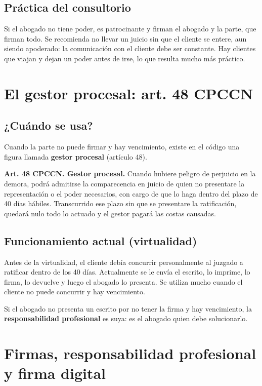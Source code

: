 \documentclass[12pt,oneside]{book}
\begin{document}
\subsection{Práctica del consultorio}

Si el abogado no tiene poder, es patrocinante y firman el abogado y la parte, que firman todo. Se recomienda no llevar un juicio sin que el cliente se entere, aun siendo apoderado: la comunicación con el cliente debe ser constante. Hay clientes que viajan y dejan un poder antes de irse, lo que resulta mucho más práctico.

\section{El gestor procesal: art. 48 CPCCN}

\subsection{¿Cuándo se usa?}

Cuando la parte no puede firmar y hay vencimiento, existe en el código una figura llamada \textbf{gestor procesal} (artículo 48).

\begin{important}
\textbf{Art. 48 CPCCN. Gestor procesal.} Cuando hubiere peligro de perjuicio en la demora, podrá admitirse la comparecencia en juicio de quien no presentare la representación o el poder necesarios, con cargo de que lo haga dentro del plazo de 40 días hábiles. Transcurrido ese plazo sin que se presentare la ratificación, quedará nulo todo lo actuado y el gestor pagará las costas causadas.
\end{important}

\subsection{Funcionamiento actual (virtualidad)}

Antes de la virtualidad, el cliente debía concurrir personalmente al juzgado a ratificar dentro de los 40 días. Actualmente se le envía el escrito, lo imprime, lo firma, lo devuelve y luego el abogado lo presenta. Se utiliza mucho cuando el cliente no puede concurrir y hay vencimiento.

Si el abogado no presenta un escrito por no tener la firma y hay vencimiento, la \textbf{responsabilidad profesional} es suya: es el abogado quien debe solucionarlo.

\section{Firmas, responsabilidad profesional y firma digital}
\end{document}
